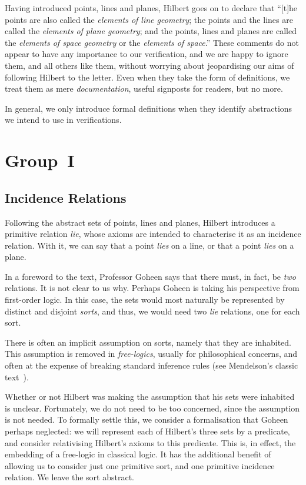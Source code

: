 Having introduced points, lines and planes, Hilbert goes on to declare that ``[t]he points are also called the \emph{elements of line geometry}; the points and the lines are called the \emph{elements of plane geometry}; and the points, lines and planes are called the \emph{elements of space geometry} or the \emph{elements of space}.'' These comments do not appear to have any importance to our verification, and we are happy to ignore them, and all others like them, without worrying about jeopardising our aims of following Hilbert to the letter. Even when they take the form of definitions, we treat them as mere \emph{documentation}, useful signposts for readers, but no more.

In general, we only introduce formal definitions when they identify abstractions we intend to use in verifications.

\section{Group~I}
\subsection{Incidence Relations}
Following the abstract sets of points, lines and planes, Hilbert introduces a primitive  relation \emph{lie}, whose axioms are intended to characterise it as an incidence relation. With it, we can say that a point \emph{lies} on a line, or that a point \emph{lies} on a plane.

In a foreword to the text, Professor Goheen says that there must, in fact, be \emph{two} relations. It is not clear to us why. Perhaps Goheen is taking his perspective from first-order logic. In this case, the sets would most naturally be represented by distinct and disjoint \emph{sorts}, and thus, we would need two \emph{lie} relations, one for each sort.

There is often an implicit assumption on sorts, namely that they are inhabited. This assumption is removed in \emph{free-logics}, usually for philosophical concerns, and often at the expense of breaking standard inference rules (see Mendelson's classic text~\cite{Mendelson}).

Whether or not Hilbert was making the assumption that his sets were inhabited is unclear. Fortunately, we do not need to be too concerned, since the assumption is not needed. To formally settle this, we consider a formalisation that Goheen perhaps neglected: we will represent each of Hilbert's three sets by a predicate, and consider relativising Hilbert's axioms to this predicate. This is, in effect, the embedding of a free-logic in classical logic. It has the additional benefit of allowing us to consider just one primitive sort, and one primitive incidence relation. We leave the sort abstract.

